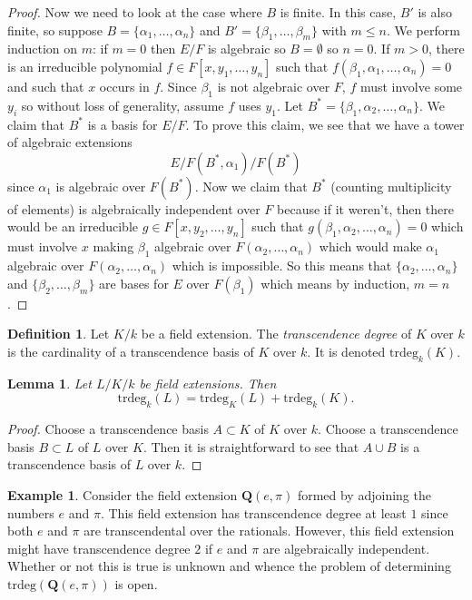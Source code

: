 \documentclass{stacks-project}
\theoremstyle{plain}
\newtheorem{lemma}[subsection]{Lemma}
\theoremstyle{definition}
\newtheorem{definition}[subsection]{Definition}
\newtheorem{example}[subsection]{Example}
\theoremstyle{remark}
\numberwithin{equation}{subsection}
\begin{document}
\begin{proof}
\medskip\noindent
Now we need to look at the case where $B$ is finite.
In this case, $B'$ is also finite, so suppose
$B = \{\alpha_1, \ldots, \alpha_n\}$ and
$B' = \{\beta_1, \ldots, \beta_m\}$ with $m \leq n$.
We perform induction on $m$: if $m = 0$ then $E/F$ is algebraic so
$B = \emptyset$ so $n = 0$. If $m > 0$, there is an irreducible polynomial
$f \in F[x, y_1, \ldots, y_n]$ such that
$f(\beta_1, \alpha_1, \ldots, \alpha_n) = 0$ and such that $x$ occurs in $f$.
Since $\beta_1$ is not algebraic over $F$, $f$ must involve some $y_i$
so without loss of generality, assume $f$ uses $y_1$.
Let $B^* = \{\beta_1, \alpha_2, \ldots, \alpha_n\}$.
We claim that $B^*$ is a basis for $E/F$. To prove this claim, we see that
we have a tower of algebraic extensions
$$
E/ F(B^*, \alpha_1) / F(B^*)
$$
since $\alpha_1$ is algebraic over $F(B^*)$.
Now we claim that $B^*$ (counting multiplicity of elements) is
algebraically independent over $F$ because if it weren't, then there would be an
irreducible $g\in F[x, y_2, \ldots, y_n]$ such that
$g(\beta_1, \alpha_2, \ldots, \alpha_n) = 0$
which must involve $x$ making $\beta_1$
algebraic over $F(\alpha_2, \ldots, \alpha_n)$ which would make $\alpha_1$
algebraic over $F(\alpha_2, \ldots, \alpha_n)$ which is impossible.
So this means that $\{\alpha_2, \ldots, \alpha_n\}$ and
$\{\beta_2, \ldots, \beta_m\}$ are bases for $E$ over $F(\beta_1)$
which means by induction, $m = n$.
\end{proof}

\begin{definition}
\label{definition-transcendence-degree}
Let $K/k$ be a field extension.
The {\it transcendence degree} of $K$ over $k$ is
the cardinality of a transcendence basis of $K$ over $k$.
It is denoted $\text{trdeg}_k(K)$.
\end{definition}

\begin{lemma}
\label{lemma-transcendence-degree-tower}
Let $L/K/k$ be field extensions.
Then
$$
\text{trdeg}_k(L) =
\text{trdeg}_K(L) +
\text{trdeg}_k(K).
$$
\end{lemma}

\begin{proof}
Choose a transcendence basis $A \subset K$ of $K$ over $k$.
Choose a transcendence basis $B \subset L$ of $L$ over $K$.
Then it is straightforward to see that $A \cup B$ is a transcendence
basis of $L$ over $k$.
\end{proof}

\begin{example}
\label{example-pi-e-transcendental}
Consider the field extension $\mathbf{Q}(e, \pi)$ formed by
adjoining the numbers $e$ and $\pi$. This field extension has transcendence
degree at least $1$ since both $e$ and $\pi$ are transcendental over the
rationals. However, this field extension might have transcendence
degree $2$ if $e$ and $\pi$ are algebraically independent. Whether or
not this is true is unknown and whence the problem of determining
$\text{trdeg}(\mathbf{Q}(e, \pi))$ is open.
\end{example}
\end{document}
